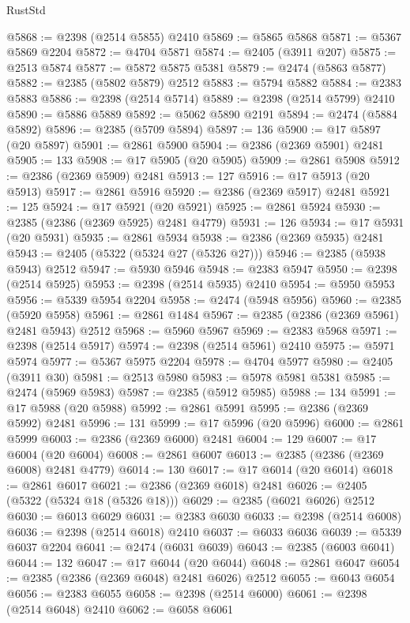 \begin{lexlean}{RustStd}
\begin{coremodule}
@5868 := @2398 (@2514 @5855) @2410
@5869 := @5865 @5868
@5871 := @5367 @5869 @2204
@5872 := @4704 @5871
@5874 := @2405 (@3911 @207)
@5875 := @2513 @5874
@5877 := @5872 @5875 @5381
@5879 := @2474 (@5863 @5877)
@5882 := @2385 (@5802 @5879) @2512
@5883 := @5794 @5882
@5884 := @2383 @5883
@5886 := @2398 (@2514 @5714)
@5889 := @2398 (@2514 @5799) @2410
@5890 := @5886 @5889
@5892 := @5062 @5890 @2191
@5894 := @2474 (@5884 @5892)
@5896 := @2385 (@5709 @5894)
@5897 := 136
@5900 := @17 @5897 (@20 @5897)
@5901 := @2861 @5900
@5904 := @2386 (@2369 @5901) @2481
@5905 := 133
@5908 := @17 @5905 (@20 @5905)
@5909 := @2861 @5908
@5912 := @2386 (@2369 @5909) @2481
@5913 := 127
@5916 := @17 @5913 (@20 @5913)
@5917 := @2861 @5916
@5920 := @2386 (@2369 @5917) @2481
@5921 := 125
@5924 := @17 @5921 (@20 @5921)
@5925 := @2861 @5924
@5930 := @2385 (@2386 (@2369 @5925) @2481 @4779)
@5931 := 126
@5934 := @17 @5931 (@20 @5931)
@5935 := @2861 @5934
@5938 := @2386 (@2369 @5935) @2481
@5943 := @2405 (@5322 (@5324 @27 (@5326 @27)))
@5946 := @2385 (@5938 @5943) @2512
@5947 := @5930 @5946
@5948 := @2383 @5947
@5950 := @2398 (@2514 @5925)
@5953 := @2398 (@2514 @5935) @2410
@5954 := @5950 @5953
@5956 := @5339 @5954 @2204
@5958 := @2474 (@5948 @5956)
@5960 := @2385 (@5920 @5958)
@5961 := @2861 @1484
@5967 := @2385 (@2386 (@2369 @5961) @2481 @5943) @2512
@5968 := @5960 @5967
@5969 := @2383 @5968
@5971 := @2398 (@2514 @5917)
@5974 := @2398 (@2514 @5961) @2410
@5975 := @5971 @5974
@5977 := @5367 @5975 @2204
@5978 := @4704 @5977
@5980 := @2405 (@3911 @30)
@5981 := @2513 @5980
@5983 := @5978 @5981 @5381
@5985 := @2474 (@5969 @5983)
@5987 := @2385 (@5912 @5985)
@5988 := 134
@5991 := @17 @5988 (@20 @5988)
@5992 := @2861 @5991
@5995 := @2386 (@2369 @5992) @2481
@5996 := 131
@5999 := @17 @5996 (@20 @5996)
@6000 := @2861 @5999
@6003 := @2386 (@2369 @6000) @2481
@6004 := 129
@6007 := @17 @6004 (@20 @6004)
@6008 := @2861 @6007
@6013 := @2385 (@2386 (@2369 @6008) @2481 @4779)
@6014 := 130
@6017 := @17 @6014 (@20 @6014)
@6018 := @2861 @6017
@6021 := @2386 (@2369 @6018) @2481
@6026 := @2405 (@5322 (@5324 @18 (@5326 @18)))
@6029 := @2385 (@6021 @6026) @2512
@6030 := @6013 @6029
@6031 := @2383 @6030
@6033 := @2398 (@2514 @6008)
@6036 := @2398 (@2514 @6018) @2410
@6037 := @6033 @6036
@6039 := @5339 @6037 @2204
@6041 := @2474 (@6031 @6039)
@6043 := @2385 (@6003 @6041)
@6044 := 132
@6047 := @17 @6044 (@20 @6044)
@6048 := @2861 @6047
@6054 := @2385 (@2386 (@2369 @6048) @2481 @6026) @2512
@6055 := @6043 @6054
@6056 := @2383 @6055
@6058 := @2398 (@2514 @6000)
@6061 := @2398 (@2514 @6048) @2410
@6062 := @6058 @6061

\end{coremodule}
\end{lexlean}
